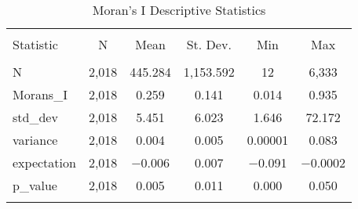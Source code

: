 \begin{table}[!htbp] \centering 
    \caption{Moran's I Descriptive Statistics} 
    \label{moran_desc} 
  \begin{tabular}{@{\extracolsep{5pt}}lccccc} 
  \\[-1.8ex]\hline 
  \hline \\[-1.8ex] 
  Statistic & \multicolumn{1}{c}{N} & \multicolumn{1}{c}{Mean} & \multicolumn{1}{c}{St. Dev.} & \multicolumn{1}{c}{Min} & \multicolumn{1}{c}{Max} \\ 
  \hline \\[-1.8ex] 
  N & 2,018 & 445.284 & 1,153.592 & 12 & 6,333 \\ 
  Morans\_I & 2,018 & 0.259 & 0.141 & 0.014 & 0.935 \\ 
  std\_dev & 2,018 & 5.451 & 6.023 & 1.646 & 72.172 \\ 
  variance & 2,018 & 0.004 & 0.005 & 0.00001 & 0.083 \\ 
  expectation & 2,018 & $-$0.006 & 0.007 & $-$0.091 & $-$0.0002 \\ 
  p\_value & 2,018 & 0.005 & 0.011 & 0.000 & 0.050 \\ 
  \hline \\[-1.8ex] 
  \end{tabular} 
  \end{table} 